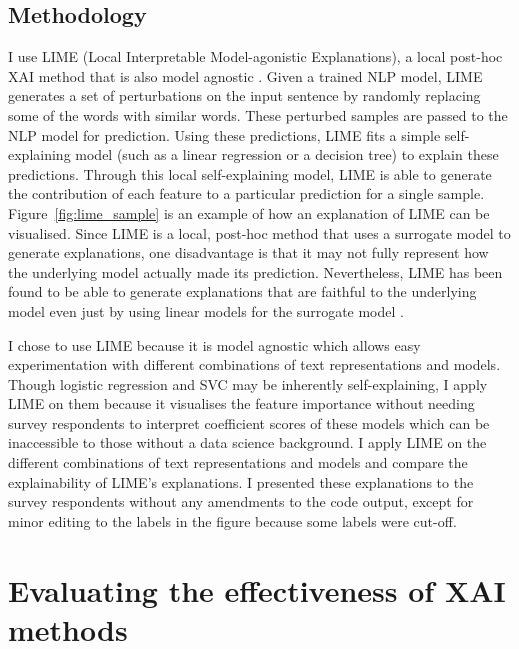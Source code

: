 \subsection{Methodology}
I use LIME (Local Interpretable Model-agonistic Explanations), a local post-hoc XAI method that is also model agnostic \cite{lime}. Given a trained NLP model, LIME generates a set of perturbations on the input sentence by randomly replacing some of the words with similar words. These perturbed samples are passed to the NLP model for prediction. Using these predictions, LIME fits a simple self-explaining model (such as a linear regression or a decision tree) to explain these predictions. Through this local self-explaining model, LIME is able to generate the contribution of each feature to a particular prediction for a single sample. Figure~\ref{fig:lime_sample} is an example of how an explanation of LIME can be visualised. Since LIME is a local, post-hoc method that uses a surrogate model to generate explanations, one disadvantage is that it may not fully represent how the underlying model actually made its prediction. Nevertheless, LIME has been found to be able to generate explanations that are faithful to the underlying model even just by using linear models for the surrogate model \cite{lime}.

I chose to use LIME because it is model agnostic which allows easy experimentation with different combinations of text representations and models. Though logistic regression and SVC may be inherently self-explaining, I apply LIME on them because it visualises the feature importance without needing survey respondents to interpret coefficient scores of these models which can be inaccessible to those without a data science background. I apply LIME on the different combinations of text representations and models and compare the explainability of LIME's explanations. I presented these explanations to the survey respondents without any amendments to the code output, except for minor editing to the labels in the figure because some labels were cut-off.

\section{Evaluating the effectiveness of XAI methods}
